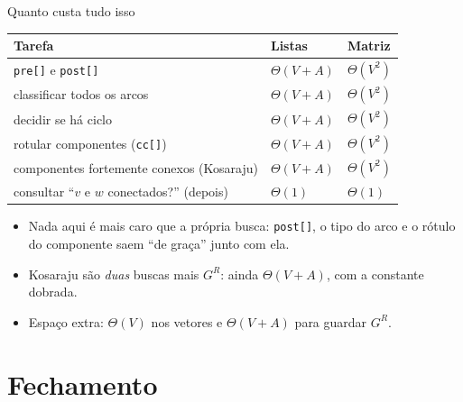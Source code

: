 \documentclass[aspectratio=169]{beamer}
\begin{document}
\begin{frame}{Quanto custa tudo isso}
  \begin{center}
  {\small
  \begin{tabular}{lll}
    \toprule
    \textbf{Tarefa} & \textbf{Listas} & \textbf{Matriz} \\
    \midrule
    \texttt{pre[]} e \texttt{post[]}            & $\Theta(V+A)$ & $\Theta(V^2)$ \\
    classificar todos os arcos                  & $\Theta(V+A)$ & $\Theta(V^2)$ \\
    decidir se há ciclo                         & $\Theta(V+A)$ & $\Theta(V^2)$ \\
    rotular componentes (\texttt{cc[]})         & $\Theta(V+A)$ & $\Theta(V^2)$ \\
    componentes fortemente conexos (Kosaraju)   & $\Theta(V+A)$ & $\Theta(V^2)$ \\
    consultar ``$v$ e $w$ conectados?'' (depois)& $\Theta(1)$   & $\Theta(1)$ \\
    \bottomrule
  \end{tabular}}
  \end{center}
  \medskip
  {\small
  \begin{itemize}\small\setlength{\itemsep}{1pt}
    \item Nada aqui é mais caro que a própria busca: \texttt{post[]}, o tipo do
          arco e o rótulo do componente saem ``de graça'' junto com ela.
    \item Kosaraju são \emph{duas} buscas mais $G^R$: ainda $\Theta(V+A)$, com
          a constante dobrada.
    \item Espaço extra: $\Theta(V)$ nos vetores e $\Theta(V+A)$ para guardar
          $G^R$.
  \end{itemize}}
\end{frame}

\section{Fechamento}
\end{document}
